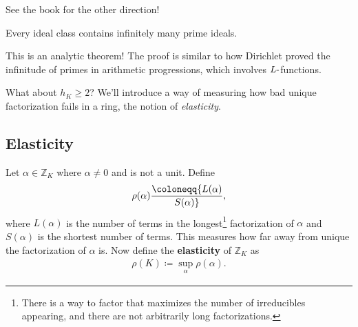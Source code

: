 \begin{remark}

See the book for the other direction!

\end{remark}

\begin{theorem}[Landau]

Every ideal class contains infinitely many prime ideals.

\end{theorem}

\begin{remark}

This is an analytic theorem! The proof is similar to how Dirichlet
proved the infinitude of primes in arithmetic progressions, which
involves \(L{\hbox{-}}\)functions.

\end{remark}

\begin{remark}

What about \(h_K \geq 2\)? We'll introduce a way of measuring how bad
unique factorization fails in a ring, the notion of \emph{elasticity}.

\end{remark}

\hypertarget{elasticity}{%
\subsection{Elasticity}\label{elasticity}}

\begin{definition}

Let \(\alpha\in {\mathbb{Z}}_K\) where \(\alpha\neq 0\) and is not a
unit. Define
\begin{align*}
\rho(\alpha) \coloneqq{ L( \alpha) \over S( \alpha) }
,\end{align*}
where \(L( \alpha)\) is the number of terms in the longest\footnote{There
  is a way to factor that maximizes the number of irreducibles
  appearing, and there are not arbitrarily long factorizations.}
factorization of \(\alpha\) and \(S( \alpha )\) is the shortest number
of terms. This measures how far away from unique the factorization of
\(\alpha\) is. Now define the \textbf{elasticity} of \({\mathbb{Z}}_K\)
as
\begin{align*}
\rho(K) \coloneqq\sup_{\alpha} \rho( \alpha)
.\end{align*}

\end{definition}


